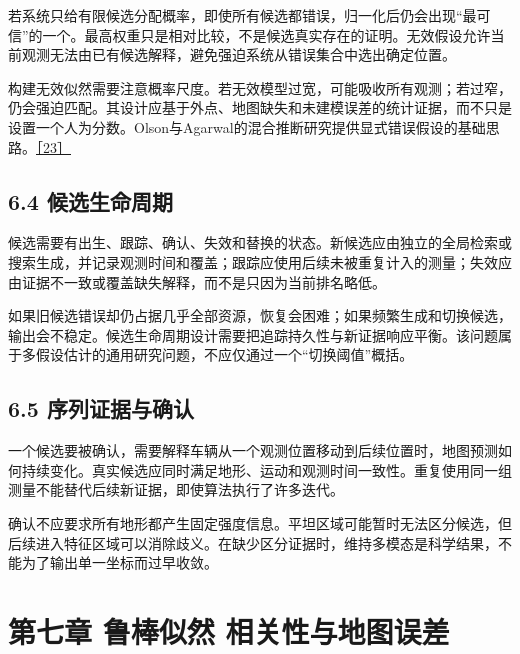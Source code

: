 若系统只给有限候选分配概率，即使所有候选都错误，归一化后仍会出现``最可信''的一个。最高权重只是相对比较，不是候选真实存在的证明。无效假设允许当前观测无法由已有候选解释，避免强迫系统从错误集合中选出确定位置。

构建无效似然需要注意概率尺度。若无效模型过宽，可能吸收所有观测；若过窄，仍会强迫匹配。其设计应基于外点、地图缺失和未建模误差的统计证据，而不只是设置一个人为分数。Olson与Agarwal的混合推断研究提供显式错误假设的基础思路。\href{https://april.eecs.umich.edu/media/pdfs/olson2012rss.pdf}{［23］}

\hypertarget{ux5019ux9009ux751fux547dux5468ux671f}{%
\subsection{6.4 候选生命周期}\label{ux5019ux9009ux751fux547dux5468ux671f}}

候选需要有出生、跟踪、确认、失效和替换的状态。新候选应由独立的全局检索或搜索生成，并记录观测时间和覆盖；跟踪应使用后续未被重复计入的测量；失效应由证据不一致或覆盖缺失解释，而不是只因为当前排名略低。

如果旧候选错误却仍占据几乎全部资源，恢复会困难；如果频繁生成和切换候选，输出会不稳定。候选生命周期设计需要把追踪持久性与新证据响应平衡。该问题属于多假设估计的通用研究问题，不应仅通过一个``切换阈值''概括。

\hypertarget{ux5e8fux5217ux8bc1ux636eux4e0eux786eux8ba4}{%
\subsection{6.5 序列证据与确认}\label{ux5e8fux5217ux8bc1ux636eux4e0eux786eux8ba4}}

一个候选要被确认，需要解释车辆从一个观测位置移动到后续位置时，地图预测如何持续变化。真实候选应同时满足地形、运动和观测时间一致性。重复使用同一组测量不能替代后续新证据，即使算法执行了许多迭代。

确认不应要求所有地形都产生固定强度信息。平坦区域可能暂时无法区分候选，但后续进入特征区域可以消除歧义。在缺少区分证据时，维持多模态是科学结果，不能为了输出单一坐标而过早收敛。

\hypertarget{ux7b2cux4e03ux7ae0-ux9c81ux68d2ux4f3cux7136-ux76f8ux5173ux6027ux4e0eux5730ux56feux8befux5dee}{%
\section{第七章 鲁棒似然 相关性与地图误差}\label{ux7b2cux4e03ux7ae0-ux9c81ux68d2ux4f3cux7136-ux76f8ux5173ux6027ux4e0eux5730ux56feux8befux5dee}}

